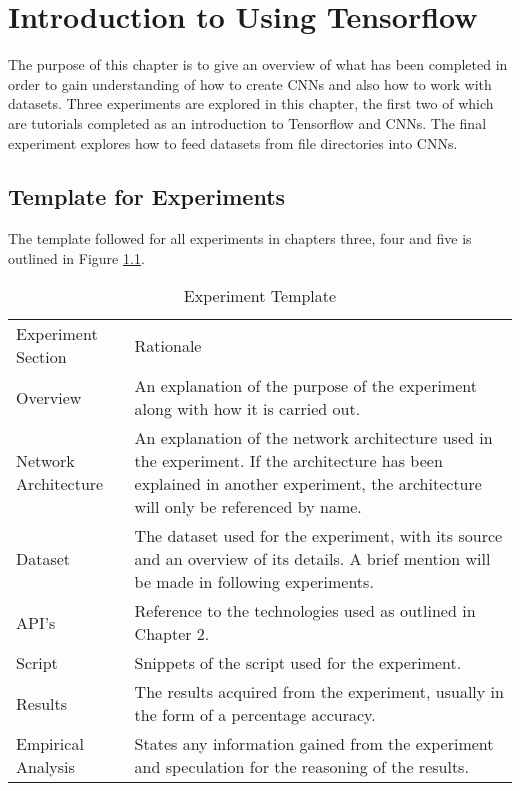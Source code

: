   \chapter{Introduction to Using Tensorflow}
The purpose of this chapter is to give an overview of what has been completed in order to gain understanding of how to create CNNs and also how to work with datasets. Three experiments are explored in this chapter, the first two of which are tutorials completed as an introduction to Tensorflow and CNNs. The final experiment explores how to feed datasets from file directories into CNNs.

\section{Template for Experiments}
The template followed for all experiments in chapters three, four and five is outlined in Figure \ref{fig:expTemplate}.

\begin{table}[]
\centering
\caption{Experiment Template}
\label{fig:expTemplate}
\begin{tabular}{|p{4cm}|p{11cm}|}
Experiment Section   & Rationale                \\
Overview             & An explanation of the purpose of the experiment along with how it is carried out. \\
Network Architecture & An explanation of the network architecture used in the experiment. If the architecture has been explained in another experiment, the architecture will only be referenced by name.                       \\
Dataset              & The dataset used for the experiment, with its source and an overview of its details. A brief mention will be made in following experiments.                       \\
API's                & Reference to the technologies used as outlined in Chapter 2.                      \\
Script               & Snippets of the script used for the experiment.                       \\
Results              & The results acquired from the experiment, usually in the form of a percentage accuracy.                       \\
Empirical Analysis   & States any information gained from the experiment and speculation for the reasoning of the results.                      
\end{tabular}
\end{table}

